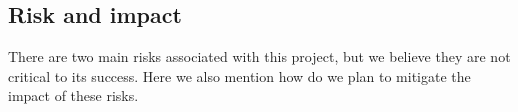 
\subsection*{Risk and impact}

%


There are two main risks associated with this project, but we believe they are not critical to its success. Here we also mention how do we plan to mitigate the impact of these risks.

